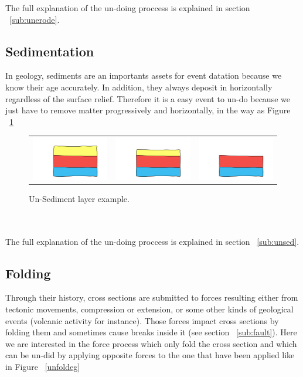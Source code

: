 \documentclass[12pt, a4paper]{report} %
\begin{document}
The full explanation of the un-doing proccess is explained in section ~\ref{sub:unerode}.

\subsection{Sedimentation}
In geology, sediments are an importants assets for event datation because we know their age accurately. In addition, they always deposit in horizontally regardless of the surface relief. Therefore it is a easy event to un-do because we just have to remove matter progressively and horizontally, in the way as Figure ~\ref{unsedeg}
\begin{figure}[htb]
\centering
\begin{tabular}{@{}ccc@{}}
\includegraphics[width=.35\textwidth]{unSedimentDescription0.png}&
\includegraphics[width=.35\textwidth]{unSedimentDescription1.png}&
\includegraphics[width=.35\textwidth]{unSedimentDescription2.png}\\
\end{tabular}
\caption{Un-Sediment layer example.}
\label{unsedeg}
\end{figure}\\\\
The full explanation of the un-doing proccess is explained in section ~\ref{sub:unsed}.

\subsection{Folding}
\label{sub:fold}
Through their history, cross sections are submitted to forces resulting either from tectonic movements, compression or extension, or some other kinds of geological events (volcanic activity for instance). Those forces impact cross sections by folding them and sometimes cause breaks inside it (see section ~\ref{sub:fault}). Here we are interested in the force process which only fold the cross section and which can be un-did by applying opposite forces to the one that have been applied like in Figure ~\ref{unfoldeg}
\end{document}
